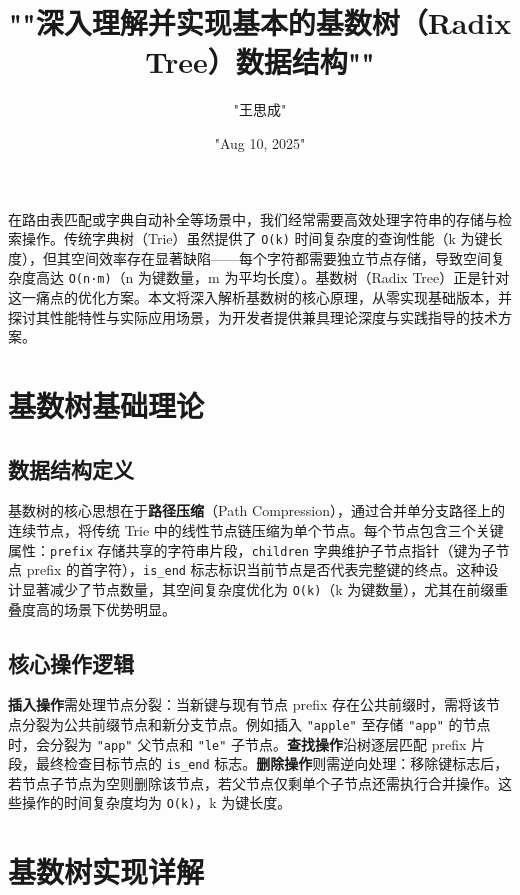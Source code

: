 \title{""深入理解并实现基本的基数树（Radix Tree）数据结构""}
\author{"王思成"}
\date{"Aug 10, 2025"}
\maketitle
在路由表匹配或字典自动补全等场景中，我们经常需要高效处理字符串的存储与检索操作。传统字典树（Trie）虽然提供了 \texttt{O(k)} 时间复杂度的查询性能（k 为键长度），但其空间效率存在显著缺陷——每个字符都需要独立节点存储，导致空间复杂度高达 \texttt{O(n·m)}（n 为键数量，m 为平均长度）。基数树（Radix Tree）正是针对这一痛点的优化方案。本文将深入解析基数树的核心原理，从零实现基础版本，并探讨其性能特性与实际应用场景，为开发者提供兼具理论深度与实践指导的技术方案。\par
\chapter{基数树基础理论}
\section{数据结构定义}
基数树的核心思想在于\textbf{路径压缩}（Path Compression），通过合并单分支路径上的连续节点，将传统 Trie 中的线性节点链压缩为单个节点。每个节点包含三个关键属性：\texttt{prefix} 存储共享的字符串片段，\texttt{children} 字典维护子节点指针（键为子节点 prefix 的首字符），\texttt{is\_{}end} 标志标识当前节点是否代表完整键的终点。这种设计显著减少了节点数量，其空间复杂度优化为 \texttt{O(k)}（k 为键数量），尤其在前缀重叠度高的场景下优势明显。\par
\section{核心操作逻辑}
\textbf{插入操作}需处理节点分裂：当新键与现有节点 prefix 存在公共前缀时，需将该节点分裂为公共前缀节点和新分支节点。例如插入 \texttt{"apple"} 至存储 \texttt{"app"} 的节点时，会分裂为 \texttt{"app"} 父节点和 \texttt{"le"} 子节点。\textbf{查找操作}沿树逐层匹配 prefix 片段，最终检查目标节点的 \texttt{is\_{}end} 标志。\textbf{删除操作}则需逆向处理：移除键标志后，若节点子节点为空则删除该节点，若父节点仅剩单个子节点还需执行合并操作。这些操作的时间复杂度均为 \texttt{O(k)}，k 为键长度。\par
\chapter{基数树实现详解}
